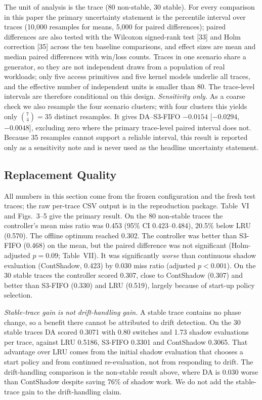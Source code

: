 \documentclass[10pt,twocolumn,a4paper]{IEEEtran}
\begin{document}
The unit of analysis is the trace (80 non-stable, 30 stable). For every
comparison in this paper the primary uncertainty statement is the percentile
interval over traces (10,000 resamples for means, 5,000 for paired
differences); paired differences are also tested with the Wilcoxon signed-rank
test [33] and Holm correction [35] across the ten baseline comparisons, and
effect sizes are mean and median paired differences with win/loss counts.
Traces in one scenario share a generator, so they are not independent draws
from a population of real workloads; only five access primitives and five
kernel models underlie all traces, and the effective number of independent
units is smaller than 80. The trace-level intervals are therefore conditional
on this design. \emph{Sensitivity only.} As a coarse check we also resample the
four scenario clusters; with four clusters this yields only $\binom{7}{4}=35$
distinct resamples. It gives DA--S3-FIFO $-0.0154$ [$-0.0294$, $-0.0048$],
excluding zero where the primary trace-level paired interval does not. Because
35 resamples cannot support a reliable interval, this result is reported only
as a sensitivity note and is never used as the headline uncertainty statement.



\subsection{Replacement Quality}

All numbers in this section come from the frozen configuration and the fresh
test traces; the raw per-trace CSV output is in the reproduction package.
Table~VI and Figs.~3--5 give the primary result. On the 80 non-stable traces
the controller's mean miss ratio was 0.453 (95\% CI 0.423--0.484), 20.5\%
below LRU (0.570). The offline optimum reached 0.302. The controller was
better than S3-FIFO (0.468) on the mean, but the paired difference was not
significant (Holm-adjusted $p = 0.09$; Table~VII). It was significantly
\emph{worse} than continuous shadow evaluation (ContShadow, 0.423) by 0.030
miss ratio (adjusted $p < 0.001$). On the 30 stable traces the controller
scored 0.307, close to ContShadow (0.307) and better than S3-FIFO (0.330) and
LRU (0.519), largely because of start-up policy selection.

\emph{Stable-trace gain is not drift-handling gain.} A stable trace contains no
phase change, so a benefit there cannot be attributed to drift detection. On
the 30 stable traces DA scored 0.3071 with 0.80 switches and 1.73 shadow
evaluations per trace, against LRU 0.5186, S3-FIFO 0.3301 and ContShadow
0.3065. That advantage over LRU comes from the initial shadow evaluation that
chooses a start policy and from continued re-evaluation, not from responding
to drift. The drift-handling comparison is the non-stable result above, where
DA is 0.030 worse than ContShadow despite saving 76\% of shadow work. We do
not add the stable-trace gain to the drift-handling claim.
\end{document}
